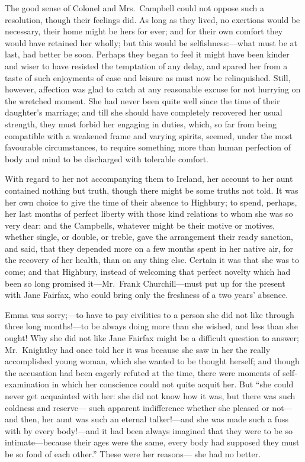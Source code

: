 The good sense of Colonel and Mrs.\ Campbell could not oppose such
a resolution, though their feelings did.  As long as they lived,
no exertions would be necessary, their home might be hers for ever;
and for their own comfort they would have retained her wholly;
but this would be selfishness:---what must be at last, had better
be soon.  Perhaps they began to feel it might have been kinder
and wiser to have resisted the temptation of any delay, and spared
her from a taste of such enjoyments of ease and leisure as must
now be relinquished.  Still, however, affection was glad to catch
at any reasonable excuse for not hurrying on the wretched moment.
She had never been quite well since the time of their daughter's marriage;
and till she should have completely recovered her usual strength,
they must forbid her engaging in duties, which, so far from being
compatible with a weakened frame and varying spirits, seemed,
under the most favourable circumstances, to require something
more than human perfection of body and mind to be discharged with
tolerable comfort.

With regard to her not accompanying them to Ireland, her account
to her aunt contained nothing but truth, though there might be some
truths not told.  It was her own choice to give the time of their
absence to Highbury; to spend, perhaps, her last months of perfect
liberty with those kind relations to whom she was so very dear:
and the Campbells, whatever might be their motive or motives,
whether single, or double, or treble, gave the arrangement
their ready sanction, and said, that they depended more on a few
months spent in her native air, for the recovery of her health,
than on any thing else.  Certain it was that she was to come;
and that Highbury, instead of welcoming that perfect novelty which
had been so long promised it---Mr.\ Frank Churchill---must put up for
the present with Jane Fairfax, who could bring only the freshness
of a two years' absence.

Emma was sorry;---to have to pay civilities to a person she did
not like through three long months!---to be always doing more than
she wished, and less than she ought!  Why she did not like Jane
Fairfax might be a difficult question to answer; Mr.\ Knightley
had once told her it was because she saw in her the really
accomplished young woman, which she wanted to be thought herself;
and though the accusation had been eagerly refuted at the time,
there were moments of self-examination in which her conscience could
not quite acquit her.  But ``she could never get acquainted with her:
she did not know how it was, but there was such coldness and reserve---%
such apparent indifference whether she pleased or not---and then,
her aunt was such an eternal talker!---and she was made such a fuss
with by every body!---and it had been always imagined that they were
to be so intimate---because their ages were the same, every body had
supposed they must be so fond of each other.''  These were her reasons---%
she had no better.

